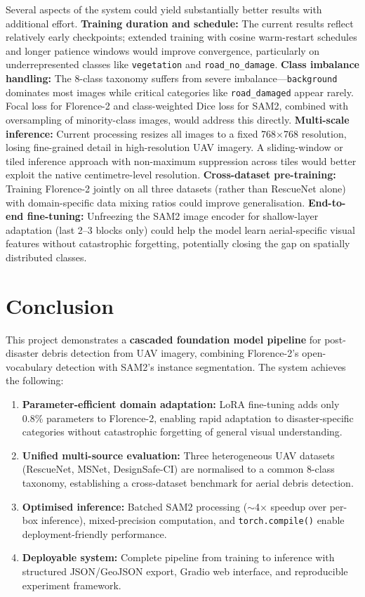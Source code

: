 \documentclass[10pt,a4paper,twocolumn]{article}
\begin{document}
Several aspects of the system could yield substantially better results with additional effort. \textbf{Training duration and schedule:} The current results reflect relatively early checkpoints; extended training with cosine warm-restart schedules and longer patience windows would improve convergence, particularly on underrepresented classes like \texttt{vegetation} and \texttt{road\_no\_damage}. \textbf{Class imbalance handling:} The 8-class taxonomy suffers from severe imbalance---\texttt{background} dominates most images while critical categories like \texttt{road\_damaged} appear rarely. Focal loss for Florence-2 and class-weighted Dice loss for SAM2, combined with oversampling of minority-class images, would address this directly. \textbf{Multi-scale inference:} Current processing resizes all images to a fixed 768$\times$768 resolution, losing fine-grained detail in high-resolution UAV imagery. A sliding-window or tiled inference approach with non-maximum suppression across tiles would better exploit the native centimetre-level resolution. \textbf{Cross-dataset pre-training:} Training Florence-2 jointly on all three datasets (rather than RescueNet alone) with domain-specific data mixing ratios could improve generalisation. \textbf{End-to-end fine-tuning:} Unfreezing the SAM2 image encoder for shallow-layer adaptation (last 2--3 blocks only) could help the model learn aerial-specific visual features without catastrophic forgetting, potentially closing the gap on spatially distributed classes.


\section{Conclusion}

This project demonstrates a \textbf{cascaded foundation model pipeline} for post-disaster debris detection from UAV imagery, combining Florence-2's open-vocabulary detection with SAM2's instance segmentation. The system achieves the following:

\begin{enumerate}
  \item \textbf{Parameter-efficient domain adaptation:} LoRA fine-tuning adds only 0.8\% parameters to Florence-2, enabling rapid adaptation to disaster-specific categories without catastrophic forgetting of general visual understanding.
  \item \textbf{Unified multi-source evaluation:} Three heterogeneous UAV datasets (RescueNet, MSNet, DesignSafe-CI) are normalised to a common 8-class taxonomy, establishing a cross-dataset benchmark for aerial debris detection.
  \item \textbf{Optimised inference:} Batched SAM2 processing ($\sim$4$\times$ speedup over per-box inference), mixed-precision computation, and \texttt{torch.compile()} enable deployment-friendly performance.
  \item \textbf{Deployable system:} Complete pipeline from training to inference with structured JSON/GeoJSON export, Gradio web interface, and reproducible experiment framework.
\end{enumerate}
\end{document}
